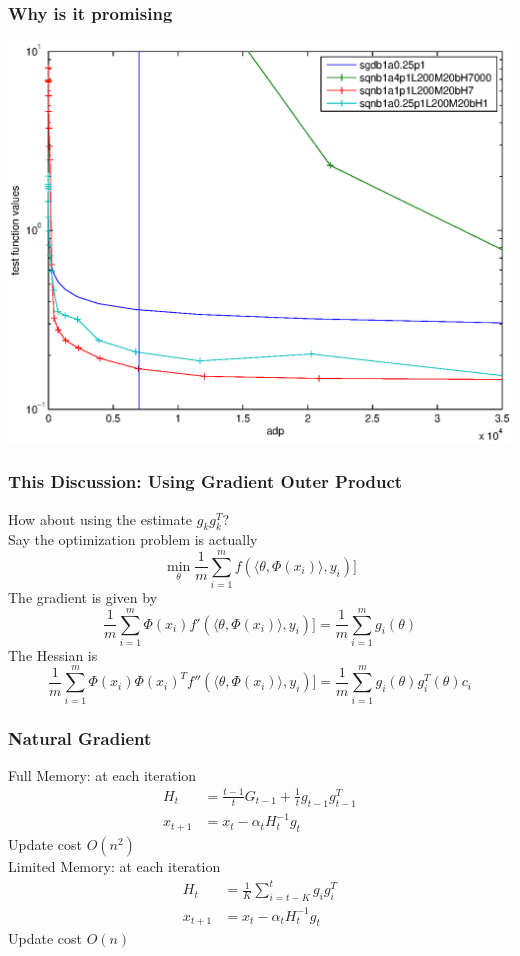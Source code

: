 \documentclass{beamer}
\begin{document}
\begin{frame}
	\frametitle{Why is it promising}
		\begin{center}
				\includegraphics[scale=0.4]{figures/P02b.eps}
		\end{center}	
\end{frame}


\begin{frame}
	\frametitle{This Discussion: Using Gradient Outer Product}
	How about using the estimate $g_k g_k^T$? \\
\pause
		Say the optimization problem is actually
			\[
				\min_{\theta} \frac{1}{m} \sum_{i=1}^{m} f(\langle \theta, \Phi(x_i) \rangle,y_i)]
			\]
			\pause
			The gradient is given by 
			\[
				  \frac{1}{m} \sum_{i=1}^{m} \Phi(x_i) f'(\langle \theta, \Phi(x_i) \rangle,y_i)] = \frac{1}{m} \sum_{i=1}^{m} g_i(\theta)  
			\]
			\pause
			The Hessian is 
			\[
				  \frac{1}{m} \sum_{i=1}^{m} \Phi(x_i)  \Phi(x_i)^T   f''(\langle \theta, \Phi(x_i) \rangle,y_i)] =\frac{1}{m} \sum_{i=1}^{m}  g_i(\theta)g_i^T(\theta) c_i
			\]
	
\end{frame}

\begin{frame}
	\frametitle{Natural Gradient}
	Full Memory: at each iteration
	\begin{align*}
	 H_{t} &= \frac{t-1}{t}G_{t-1} + \frac{1}{t} g_{t-1} g_{t-1}^T \\
	 x_{t+1} &= x_{t} - \alpha_t H_t^{-1} g_t
	\end{align*}
	Update cost $O(n^2)$ \\
	\pause
	Limited Memory: at each iteration
	\begin{align*} 
	 H_{t} &= \frac{1}{K} \sum_{i=t-K}^{t} g_{i} g_{i}^T \\
	 x_{t+1} &= x_{t} - \alpha_t H_t^{-1} g_t
	\end{align*}
	Update cost $O(n)$
\end{frame}
\end{document}
